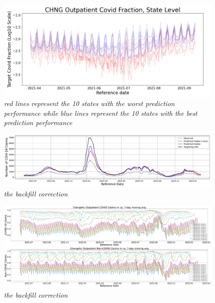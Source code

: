  

\begin{figure}
    \centering
    \includegraphics[width=\textwidth]{figs/evl_comparison_states.png}
    \caption{\textit{red lines represent the 10 states with the worst prediction performance while blue lines represent the 10 states with the best prediction performance}}
\end{figure}

\begin{figure}
    \centering
    \includegraphics[width=\textwidth]{figs/pred_problem_in_ca.pdf}
    \caption{\textit{the backfill correction}}
\end{figure}

\begin{figure}
    \centering
    \includegraphics[width=\textwidth]{figs/new_covs_zoom_in.pdf}
    \caption{\textit{the backfill correction}}
\end{figure}



